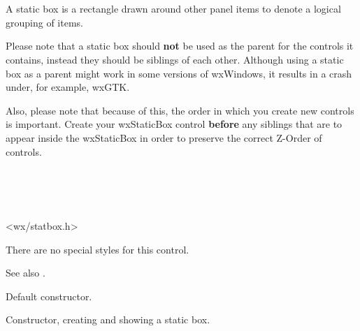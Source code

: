 \section{}\label{wxstaticbox}

A static box is a rectangle drawn around other panel items to denote
a logical grouping of items.

Please note that a static box should {\bf not} be used as the parent for the
controls it contains, instead they should be siblings of each other. Although
using a static box as a parent might work in some versions of wxWindows, it
results in a crash under, for example, wxGTK. 

Also, please note that because of this, the order in which you create new 
controls is important. Create your wxStaticBox control {\bf before} any 
siblings that are to appear inside the wxStaticBox in order to preserve the 
correct Z-Order of controls.


\\
\\
\\


<wx/statbox.h>


There are no special styles for this control.

See also .




\label{wxstaticboxconstr}


Default constructor.


Constructor, creating and showing a static box.

